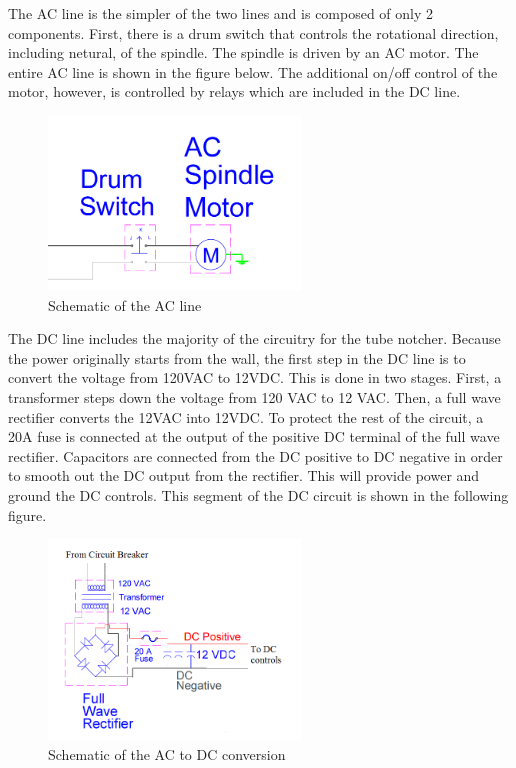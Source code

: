 The AC line is the simpler of the two lines and is composed of only 2 components. First, there is a drum switch that controls the rotational direction, including netural, of the spindle. The spindle is driven by an AC motor. The entire AC line is shown in the figure below. The additional on/off control of the motor, however, is controlled by relays which are included in the DC line.

\begin{figure}[H]
    \centering
    \includegraphics[width=0.6\textwidth]{./fall-report pictures/Chapter2-MachineDescription/AC}
    \caption{Schematic of the AC line}
    \label{fig:Electrical:AC}
\end{figure} 

The DC line includes the majority of the circuitry for the tube notcher. Because the power originally starts from the wall, the first step in the DC line is to convert the voltage from 120VAC to 12VDC. This is done in two stages. First, a transformer steps down the voltage from 120 VAC to 12 VAC. Then, a full wave rectifier converts the 12VAC into 12VDC. To protect the rest of the circuit, a 20A fuse is connected at the output of the positive DC terminal of the full wave rectifier. Capacitors are connected from the DC positive to DC negative in order to smooth out the DC output from the rectifier. This will provide power and ground the DC controls. This segment of the DC circuit is shown in the following figure.

\begin{figure}[H]
    \centering
    \includegraphics[width=0.6\textwidth]{./fall-report pictures/Chapter2-MachineDescription/ACDC}
    \caption{Schematic of the AC to DC conversion}
    \label{fig:Electrical:AC}
\end{figure} 

